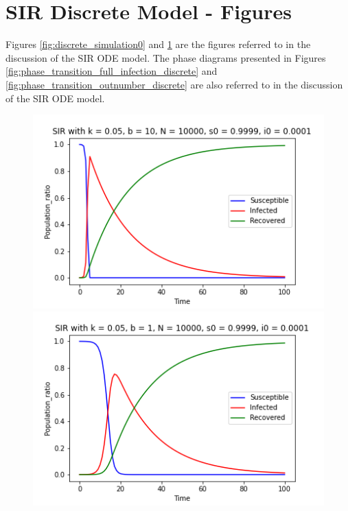 \documentclass[12pt, reqno]{amsart}
\begin{document}
    \newpage
    
    \section{SIR Discrete Model - Figures}\label{appendix:sir_discrete_figs}
    Figures \ref{fig:discrete_simulation0} and \ref{fig:discrete_simulation1} are the figures referred to in the discussion of the SIR ODE model. The phase diagrams presented in Figures \ref{fig:phase_transition_full_infection_discrete} and \ref{fig:phase_transition_outnumber_discrete} are also referred to in the discussion of the SIR ODE model.
    \begin{figure}[h]
        \centering
        \begin{minipage}[b]{0.4 \textwidth}
            \includegraphics[width=\textwidth]{sir_discrete_simulation0.png}
            \caption{}
            \label{fig:discrete_simulation0}
        \end{minipage}
        \hfill
        \begin{minipage}[b]{0.4 \textwidth}
            \includegraphics[width=\textwidth]{sir_discrete_simulation1.png}
            \caption{}
            \label{fig:discrete_simulation1}
        \end{minipage}
        
    \end{figure}
\end{document}
